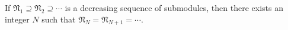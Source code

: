 If $\mathfrak{N}_1 \supseteq \mathfrak{N}_2 \supseteq \cdots$ is a decreasing sequence of submodules, then there exists an integer $N$ such that $\mathfrak{N}_N = \mathfrak{N}_{N+1} = \cdots$.
